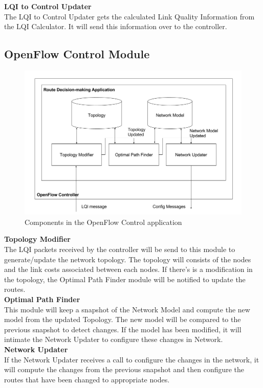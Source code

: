 \documentclass{article}
\begin{document}
\noindent \textbf{LQI to Control Updater} \\
The LQI to Control Updater gets the calculated Link Quality Information from the LQI Calculator. It will send this
information over to the controller. \\
\subsection{OpenFlow Control Module}
\begin{figure}[H]
\caption{Components in the OpenFlow Control application}
\centering
\includegraphics[width=\textwidth]{openflow}
\end{figure}
\noindent \textbf{Topology Modifier} \\
The LQI packets received by the controller will be send to this module to generate/update the network topology. The
topology will consists of the nodes and the link costs associated between each nodes. If there’s is a modification in
the topology, the Optimal Path Finder module will be notified to update the routes. \\

\noindent \textbf{Optimal Path Finder} \\
This module will keep a snapshot of the Network Model and compute the new model from the updated Topology. The new model
will be compared to the previous snapshot to detect changes. If the model has been modified, it will intimate the
Network Updater to configure these changes in Network.\\

\noindent \textbf{Network Updater} \\
If the Network Updater receives a call to configure the changes in the network, it will compute the changes from the
previous snapshot and then configure the routes that have been changed to appropriate nodes.
\end{document}
